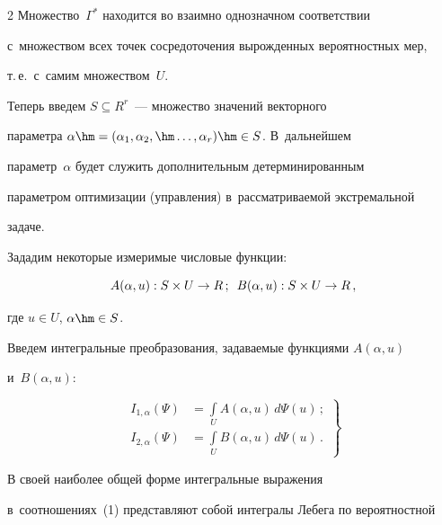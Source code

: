 \begin{multicols}{2}
Множество~$\Gamma^*$ находится во взаимно однозначном соответствии 

с~множеством всех точек сосредоточения вы\-рож\-ден\-ных вероятностных мер, 

т.\,е.\ с~самим множеством~$U$.

     

     Теперь введем $S\subseteq R^r$~--- множество значений векторного 

па\-ра\-мет\-ра $\alpha\hm= (\alpha_1,\alpha_2,\hm\ldots , \alpha_r)\hm\in S$. В~дальнейшем 

параметр~$\alpha$ будет служить дополнительным детерминированным 

параметром оптимизации (управ\-ле\-ния) в~рассматриваемой экстремальной 

задаче.

     

     Зададим некоторые измеримые чис\-ло\-вые функции:

$$

A(\alpha, u): S\times U \to R\,;\enskip B(\alpha, u): S\times U\to R\,,

$$

где $u\in U$, $\alpha\hm\in S$.

     

Введем интегральные преобразования, за\-да\-ва\-емые функциями $A(\alpha,u)$

и~$B(\alpha, u)$:



\noindent

\begin{equation}

\left. 

\begin{array}{rl}

I_{1,\alpha}(\Psi)&=\displaystyle\int\limits_U A(\alpha, u)\,d\Psi(u)\,;\\

I_{2,\alpha}(\Psi) &=\displaystyle\int\limits_U B(\alpha, u)\,d\Psi(u)\,.

\end{array}

\right\}

\label{e1-shn}

\end{equation}



В своей наиболее общей форме интегральные выражения 

в~соотношениях~(1) пред\-став\-ля\-ют собой интегралы Лебега по вероятностной 


\end{multicols}
